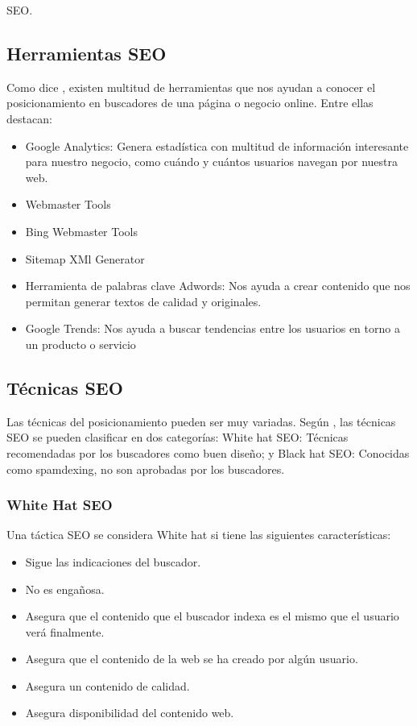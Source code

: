 \begin{section}{SEO.}
		\subsection{Herramientas SEO}
		
		Como dice \cite{seoc}, existen multitud de herramientas que nos ayudan a conocer el posicionamiento en buscadores de una página o negocio online. Entre ellas destacan:
		\begin{itemize}
			\item Google Analytics: Genera estadística con multitud de información interesante para nuestro negocio,  como cuándo y cuántos usuarios navegan por nuestra web.
			\item Webmaster Tools
			\item Bing Webmaster Tools
			\item Sitemap XMl Generator
			\item Herramienta de palabras clave Adwords: Nos ayuda a crear contenido que nos permitan generar textos de calidad y originales.
			\item Google Trends: Nos ayuda a buscar tendencias entre los usuarios en torno a un producto o servicio
		\end{itemize}
		
		\subsection{Técnicas SEO}
		Las técnicas del posicionamiento pueden ser muy variadas. Según \cite{tutorial}, las técnicas SEO se pueden clasificar en dos categorías: White hat SEO: Técnicas recomendadas por los buscadores como buen diseño; y Black hat SEO: Conocidas como spamdexing, no son aprobadas por los buscadores.

		\subsubsection{White Hat SEO}
		Una táctica SEO se considera White hat si tiene las siguientes características:
		\begin{itemize}
			\item Sigue las indicaciones del buscador.
			\item No es engañosa.
			\item Asegura que el contenido que el buscador indexa es el mismo que el usuario verá finalmente.
			\item Asegura que el contenido de la web se ha creado por algún usuario.
			\item Asegura un contenido de calidad.
			\item Asegura disponibilidad del contenido web.
		\end{itemize}
		

\end{section}
